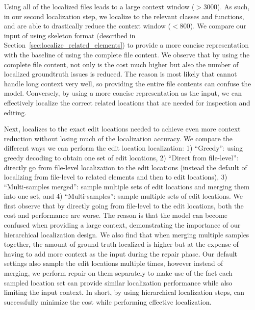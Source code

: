 Using all of the localized files leads to a large context window ($>$3000).
As such, in our second localization step, we localize to the relevant classes and functions, and are able to drastically reduce the context window ($<$800). 
We compare our input of using skeleton format (described in Section~\ref{sec:localize_related_elements}) to provide a more concise representation with the baseline of using the complete file content.
We observe that by using the complete file content, not only is the cost much higher but also the number of localized groundtruth issues is reduced. 
The reason is most likely that  cannot handle long context very well, so providing the entire file contents can confuse the model.
Conversely, by using a more concise representation as the input, we can effectively localize the correct related locations that are needed for inspection and editing. 


Next, \tech localizes to the exact edit locations needed to achieve even more context reduction without losing much of the localization accuracy. 
We compare the different ways we can perform the edit location localization: 1) ``Greedy'': using greedy decoding to obtain one set of edit locations, 2) ``Direct from file-level'': directly go from file-level localization to the edit locations (instead the default of localizing from file-level to related elements and then to edit locations), 3) ``Multi-samples merged'': sample multiple sets of edit locations and merging them into one set, and 4) ``Multi-samples'': sample multiple sets of edit locations. 
We first observe that by directly going from file-level to the edit locations, both the cost and performance are worse. 
The reason is that the model can become confused when providing a large context, demonstrating the importance of our hierarchical localization design.
We also find that when merging multiple samples together, the amount of ground truth localized is higher but at the expense of having to add more context as the input during the repair phase.
Our default settings also sample the edit locations multiple times, however instead of merging, we perform repair on them separately to make use of the fact each sampled location set can provide similar localization performance while also limiting the input context.
In short, by using hierarchical localization steps, \tech can successfully minimize the cost while performing effective localization. 



